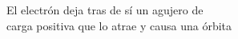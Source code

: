 \documentclass[preview]{standalone}
\begin{document}
\begin{center}
El electrón deja tras de sí un agujero de \\ carga positiva que lo atrae y causa una órbita
\end{center}
\end{document}
